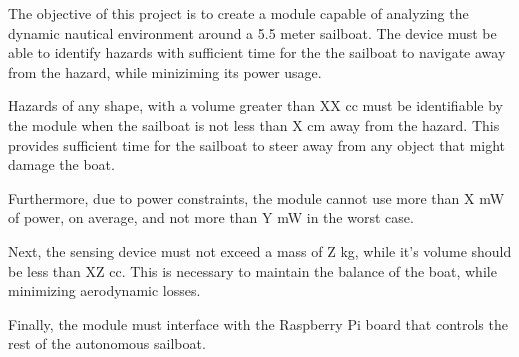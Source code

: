 The objective of this project is to create a module capable of analyzing the dynamic nautical environment around a 5.5 meter sailboat. The device must be able to identify hazards with sufficient time for the the sailboat to navigate away from the hazard, while miniziming its power usage.

Hazards of any shape, with a volume greater than XX cc must be identifiable by the module when the sailboat is not less than X cm away from the hazard. This provides sufficient time for the sailboat to steer away from any object that might damage the boat.

Furthermore, due to power constraints, the module cannot use more than X mW of power, on average, and not more than Y mW in the worst case.

Next, the sensing device must not exceed a mass of Z kg, while it's volume should be less than XZ cc. This is necessary to maintain the balance of the boat, while minimizing aerodynamic losses.

Finally, the module must interface with the Raspberry Pi board that controls the rest of the autonomous sailboat.
